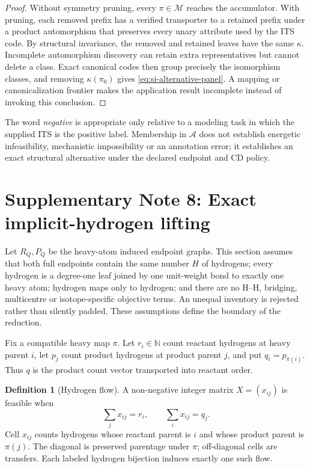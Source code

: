 \documentclass[11pt]{article}
\theoremstyle{definition}
\newtheorem{definition}[theorem]{Definition}
\newcommand{\N}{\mathbb{N}}
\begin{document}
\begin{proof}
Without symmetry pruning, every \(\pi\in\mathcal M\) reaches the accumulator.
With pruning, each removed prefix has a verified transporter to a retained
prefix under a product automorphism that preserves every unary attribute used
by the ITS code.  By structural invariance, the removed and retained leaves
have the same \(\kappa\).  Incomplete automorphism discovery can retain extra
representatives but cannot delete a class.  Exact canonical codes then group
precisely the isomorphism classes, and removing \(\kappa(\pi_0)\) gives
\cref{eq:si-alternative-panel}.  A mapping or canonicalization frontier makes
the application result incomplete instead of invoking this conclusion.
\end{proof}

The word \emph{negative} is appropriate only relative to a modeling task in
which the supplied ITS is the positive label.  Membership in \(\mathcal A\)
does not establish energetic infeasibility, mechanistic impossibility or an
annotation error; it establishes an exact structural alternative under the
declared endpoint and CD policy.

\section{Supplementary Note 8: Exact implicit-hydrogen lifting}

Let \(R_Q,P_Q\) be the heavy-atom induced endpoint graphs.  This section
assumes that both full endpoints contain the same number \(H\) of hydrogens;
every hydrogen is a degree-one leaf joined by one unit-weight bond to exactly
one heavy atom; hydrogen maps only to hydrogen; and there are no H--H,
bridging, multicentre or isotope-specific objective terms.  An unequal
inventory is rejected rather than silently padded.  These assumptions define
the boundary of the reduction.

Fix a compatible heavy map \(\pi\).  Let \(r_i\in\N\) count reactant hydrogens
at heavy parent \(i\), let \(p_j\) count product hydrogens at product parent
\(j\), and put \(q_i=p_{\pi(i)}\).  Thus \(q\) is the product count vector
transported into reactant order.

\begin{definition}[Hydrogen flow]
A non-negative integer matrix \(X=(x_{ij})\) is feasible when
\[
 \sum_jx_{ij}=r_i,\qquad \sum_ix_{ij}=q_j.
\]
Cell \(x_{ij}\) counts hydrogens whose reactant parent is \(i\) and whose
product parent is \(\pi(j)\).  The diagonal is preserved parentage under
\(\pi\); off-diagonal cells are transfers.  Each labeled hydrogen bijection
induces exactly one such flow.
\end{definition}
\end{document}
